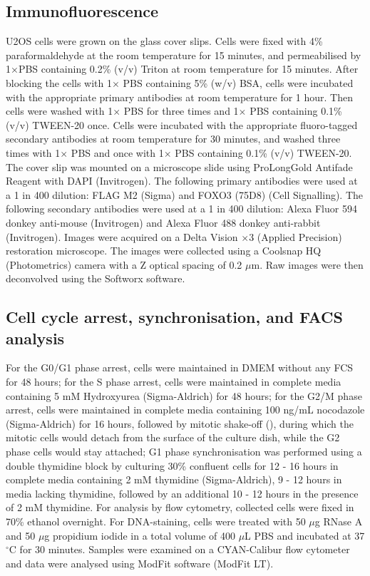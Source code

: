 \subsection{Immunofluorescence}

U2OS cells were grown on the glass cover slips. Cells were fixed with 4\% paraformaldehyde at the room temperature for 15 minutes, and permeabilised by 1×PBS containing 0.2\% (v/v) Triton at room temperature for 15 minutes. After blocking the cells with 1$\times$ PBS containing 5\% (w/v) BSA, cells were incubated with the appropriate primary antibodies at room temperature for 1 hour. Then cells were washed with 1$\times$ PBS for three times and 1$\times$ PBS containing 0.1\% (v/v) TWEEN-20 once. Cells were incubated with the appropriate fluoro-tagged secondary antibodies at room temperature for 30 minutes, and washed three times with 1$\times$ PBS and once with 1$\times$ PBS containing 0.1\% (v/v) TWEEN-20. The cover slip was mounted on a microscope slide using ProLong\textregistered Gold Antifade Reagent with DAPI (Invitrogen). The following primary antibodies were used at a 1 in 400 dilution: FLAG M2 (Sigma) and FOXO3 (75D8) (Cell Signalling). The following secondary antibodies were used at a 1 in 400 dilution: Alexa Fluor 594 donkey anti-mouse (Invitrogen) and Alexa Fluor 488 donkey anti-rabbit (Invitrogen). Images were acquired on a Delta Vision $\times$3 (Applied Precision) restoration microscope. The images were collected using a Coolsnap HQ (Photometrics) camera with a Z optical spacing of 0.2 $\mu$m. Raw images were then deconvolved using the Softworx software.

\subsection{Cell cycle arrest, synchronisation, and FACS analysis}

For the G0/G1 phase arrest, cells were maintained in DMEM without any FCS for 48 hours; for the S phase arrest, cells were maintained in complete media containing 5 mM Hydroxyurea (Sigma-Aldrich) for 48 hours; for the G2/M phase arrest, cells were maintained in complete media containing 100 ng/mL nocodazole (Sigma-Aldrich) for 16 hours, followed by mitotic shake-off (\cite{zwanenburg1983standardized}), during which the mitotic cells would detach from the surface of the culture dish, while the G2 phase cells would stay attached; G1 phase synchronisation was performed using a double thymidine block by culturing 30\% confluent cells for 12 - 16 hours in complete media containing 2 mM thymidine (Sigma-Aldrich), 9 - 12 hours in media lacking thymidine, followed by an additional 10 - 12 hours in the presence of 2 mM thymidine. For analysis by flow cytometry, collected cells were fixed in 70\% ethanol overnight. For DNA-staining, cells were treated with 50 $\mu$g RNase A and 50 $\mu$g propidium iodide in a total volume of 400 $\mu$L PBS and incubated at 37$^\circ$C for 30 minutes. Samples were examined on a CYAN-Calibur flow cytometer and data were analysed using ModFit software (ModFit LT).


